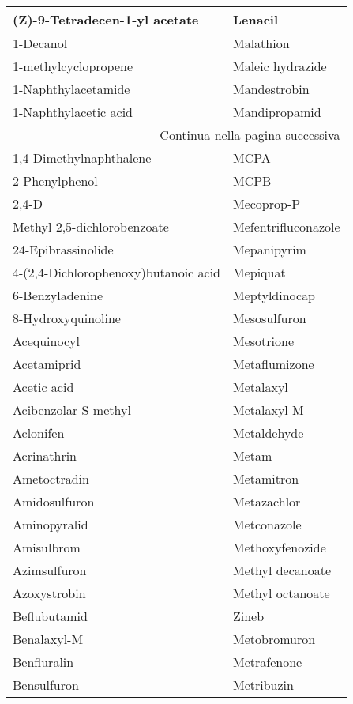 \begin{small}
\begin{longtable}{|l|l|}
        (Z)-9-Tetradecen-1-yl acetate & Lenacil \\ \hline
        1-Decanol & Malathion \\ \hline
        1-methylcyclopropene & Maleic hydrazide \\ \hline
        1-Naphthylacetamide & Mandestrobin \\ \hline
        1-Naphthylacetic acid & Mandipropamid \\ \hline
        \multicolumn{2}{|r|}{{Continua nella pagina successiva}} \\ \hline
        1,4-Dimethylnaphthalene & MCPA \\ \hline
        2-Phenylphenol & MCPB \\ \hline
        2,4-D & Mecoprop-P \\ \hline
        Methyl 2,5-dichlorobenzoate & Mefentrifluconazole \\ \hline
        24-Epibrassinolide & Mepanipyrim \\ \hline
        4-(2,4-Dichlorophenoxy)butanoic acid & Mepiquat \\ \hline
        6-Benzyladenine & Meptyldinocap \\ \hline
        8-Hydroxyquinoline & Mesosulfuron \\ \hline
        Acequinocyl & Mesotrione \\ \hline
        Acetamiprid & Metaflumizone \\ \hline
        Acetic acid & Metalaxyl \\ \hline
        Acibenzolar-S-methyl & Metalaxyl-M \\ \hline
        Aclonifen & Metaldehyde \\ \hline
        Acrinathrin & Metam \\ \hline
        Ametoctradin & Metamitron \\ \hline
        Amidosulfuron & Metazachlor \\ \hline
        Aminopyralid & Metconazole \\ \hline
        Amisulbrom & Methoxyfenozide \\ \hline
        Azimsulfuron & Methyl decanoate \\ \hline
        Azoxystrobin & Methyl octanoate \\ \hline
        Beflubutamid & Zineb \\ \hline
        Benalaxyl-M & Metobromuron \\ \hline
        Benfluralin & Metrafenone \\ \hline
        Bensulfuron & Metribuzin \\ \hline

\end{longtable}
\end{small}
